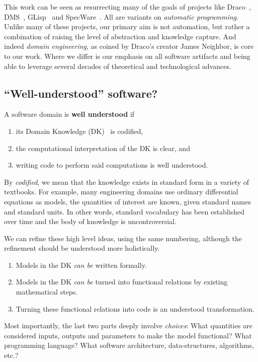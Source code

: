 \documentclass[a4paper,UKenglish,cleveref,autoref,thm-restate]{oasics-v2021}
\begin{document}
This work can be seen as resurrecting many of the goals of projects like
Draco~\cite{}, DMS~\cite{}, GLisp~\cite{} and SpecWare~\cite{}. All are
variants on \emph{automatic programming}. Unlike many of these projects, our
primary aim is not automation, but rather a combination of raising the level
of abstraction and knowledge capture. And indeed \emph{domain engineering},
as coined by Draco's creator James Neighbor, is core to our work. Where we
differ is our emphasis on all software artifacts and being able to leverage
several decades of theoretical and technological advances.

\subsection{``Well-understood'' software?}
\label{subsec:well-understood}

\begin{definition}
\label{defn:well-understood}
A software domain is \textbf{well understood} if
\begin{enumerate}
    \item its Domain Knowledge (DK)~\cite{bjorner2021domaineng} is codified,
    \item the computational interpretation of the DK is clear, and
    \item writing code to perform said computations is well understood.
\end{enumerate}
\end{definition}

By \emph{codified}, we mean that the knowledge exists in standard form in a
variety of textbooks. For example, many engineering domains use ordinary
differential equations as models, the quantities of interest are known, given
standard names and standard units. In other words, standard vocabulary has been
established over time and the body of knowledge is uncontroversial.

We can refine these high level ideas, using the same numbering, although the
refinement should be understood more holistically.
\begin{enumerate}
\item Models in the DK \emph{can be} written formally.
\item Models in the DK \emph{can be} turned into functional relations by
 existing mathematical steps.
\item Turning these functional relations into code is an understood
 transformation.
\end{enumerate}
Most importantly, the last two parts deeply involve \emph{choices}: What
quantities are considered inputs, outputs and parameters to make the model
functional? What programming language?  What software architecture,
data-structures, algorithms, etc.?
\end{document}
